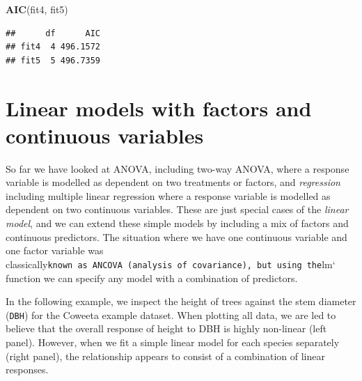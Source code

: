 \documentclass[]{book}
\newenvironment{Shaded}{\begin{snugshade}}{\end{snugshade}}
\newcommand{\KeywordTok}[1]{\textcolor[rgb]{0.13,0.29,0.53}{\textbf{#1}}}
\newcommand{\NormalTok}[1]{#1}
\begin{document}
\begin{Shaded}
\begin{Highlighting}[]
\KeywordTok{AIC}\NormalTok{(fit4, fit5)}
\end{Highlighting}
\end{Shaded}

\begin{verbatim}
##      df      AIC
## fit4  4 496.1572
## fit5  5 496.7359
\end{verbatim}

\hypertarget{lmfaccont}{%
\section{Linear models with factors and continuous variables}\label{lmfaccont}}

So far we have looked at ANOVA, including two-way ANOVA, where a response variable is modelled as dependent on two treatments or factors, and \emph{regression} including multiple linear regression where a response variable is modelled as dependent on two continuous variables. These are just special cases of the \emph{linear model}, and we can extend these simple models by including a mix of factors and continuous predictors. The situation where we have one continuous variable and one factor variable was classically\texttt{known\ as\ ANCOVA\ (analysis\ of\ covariance),\ but\ using\ the}lm` function we can specify any model with a combination of predictors.

In the following example, we inspect the height of trees against the stem diameter (\texttt{DBH}) for the Coweeta example dataset. When plotting all data, we are led to believe that the overall response of height to DBH is highly non-linear (left panel). However, when we fit a simple linear model for each species separately (right panel), the relationship appears to consist of a combination of linear responses.
\end{document}
